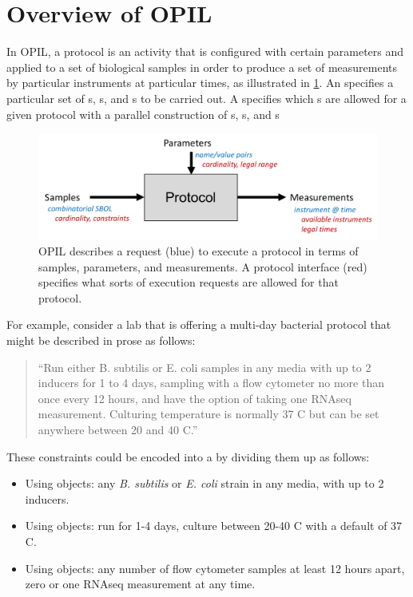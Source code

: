 \section{Overview of OPIL}

In OPIL, a protocol is an activity that is configured with certain parameters and applied to a set of biological samples in order to produce a set of measurements by particular instruments at particular times, as illustrated in \ref{f:overview}.
An  specifies a particular set of s, s, and s to be carried out. 
A  specifies which s are allowed for a given protocol with a parallel construction of s, s, and s

\begin{figure}[ht]
\begin{center}
  \includegraphics[scale=0.75]{figures/overview.pdf}
\caption{OPIL describes a request (blue) to execute a protocol in terms of samples, parameters, and measurements. 
A protocol interface (red) specifies what sorts of execution requests are allowed for that protocol.}
\label{f:overview}
\end{center}
\end{figure}

For example, consider a lab that is offering a multi-day bacterial protocol that might be described in prose as follows:
\begin{quote}
``Run either B. subtilis or E. coli samples in any media with up to 2 inducers for 1 to 4 days, sampling with a flow cytometer no more than once every 12 hours, and have the option of taking one RNAseq measurement. Culturing temperature is normally 37 C but can be set anywhere between 20 and 40 C.''
\end{quote}
These constraints could be encoded into a  by dividing them up as follows:
\begin{itemize}
\item Using  objects: any {\it B. subtilis} or {\it E. coli} strain in any media, with up to 2 inducers.
\item Using  objects: run for 1-4 days, culture between 20-40 C with a default of 37 C.
\item Using  objects: any number of flow cytometer samples at least 12 hours apart, zero or one RNAseq measurement at any time.
\end{itemize}

